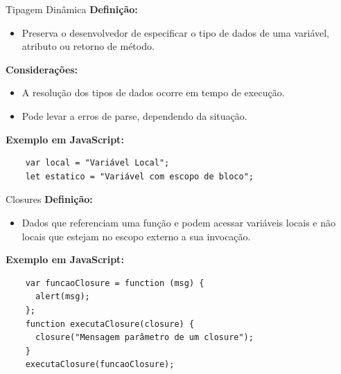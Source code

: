 \documentclass{beamer}
\begin{document}
\begin{frame}[fragile]{Tipagem Dinâmica}
	\textbf{Definição:}
	\begin{itemize}
		\item Preserva o desenvolvedor de especificar o tipo de dados de uma variável, atributo ou retorno de método.
	\end{itemize}

	\textbf{Considerações:}
	\begin{itemize}
		\item A resolução dos tipos de dados ocorre em tempo de execução.
		\item Pode levar a erros de parse, dependendo da situação.
	\end{itemize}
	\textbf{Exemplo em JavaScript:}
	\begin{verbatim}
    var local = "Variável Local";
    let estatico = "Variável com escopo de bloco";
      \end{verbatim}

\end{frame}

\begin{frame}[fragile]{Closures}
	\textbf{Definição:}
	\begin{itemize}
		\item Dados que referenciam uma função e podem acessar variáveis locais e não locais que estejam no escopo externo a sua invocação.
	\end{itemize}

	\textbf{Exemplo em JavaScript:}
	\begin{verbatim}
    var funcaoClosure = function (msg) {
      alert(msg);
    };
    function executaClosure(closure) {
      closure("Mensagem parâmetro de um closure");
    }
    executaClosure(funcaoClosure);
      \end{verbatim}
\end{frame}
\end{document}
